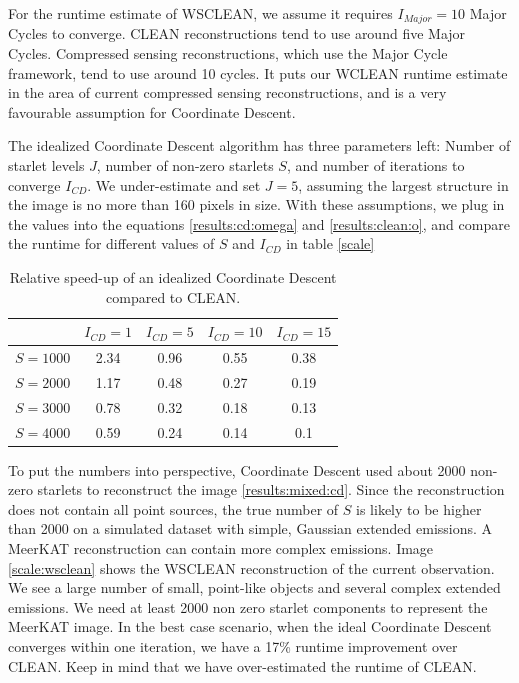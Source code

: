 For the runtime estimate of WSCLEAN, we assume it requires $I_{Major}=10$ Major Cycles to converge. CLEAN reconstructions tend to use around five Major Cycles. Compressed sensing reconstructions, which use the Major Cycle framework, tend to use around 10 cycles. It puts our WCLEAN runtime estimate in the area of current compressed sensing reconstructions, and is a very favourable assumption for Coordinate Descent.

The idealized Coordinate Descent algorithm has three parameters left: Number of starlet levels $J$, number of non-zero starlets $S$, and number of iterations to converge $I_{CD}$. We under-estimate and set $J=5$, assuming the largest structure in the image is no more than 160 pixels in size. With these assumptions, we plug in the values into the equations \eqref{results:cd:omega} and \eqref{results:clean:o}, and compare the runtime for different values of $S$ and $I_{CD}$ in table \ref{scale}

\begin{table}[h!]
	\begin{center}
		\begin{tabular}{l|c|c|c|c} %
			 & $I_{CD} = 1$ & $I_{CD} = 5$ &  $I_{CD} = 10$ &  $I_{CD} = 15$\\
			\hline
			$S=1000$ & 2.34 & 0.96 & 0.55 & 0.38 \\
			$S=2000$ & 1.17 & 0.48 & 0.27 & 0.19\\
			$S=3000$ & 0.78 & 0.32 & 0.18 & 0.13\\
			$S=4000$ & 0.59 & 0.24 & 0.14 & 0.1\\
		\end{tabular}
		\caption{Relative speed-up of an idealized Coordinate Descent compared to CLEAN.}
		\label{scale:cd:table}
	\end{center}
\end{table}

To put the numbers into perspective, Coordinate Descent used about 2000 non-zero starlets to reconstruct the image \ref{results:mixed:cd}. Since the reconstruction does not contain all point sources, the true number of $S$ is likely to be higher than 2000 on a simulated dataset with simple, Gaussian extended emissions. A MeerKAT reconstruction can contain more complex emissions. Image \ref{scale:wsclean} shows the WSCLEAN reconstruction of the current observation. We see a large number of small, point-like objects and several complex extended emissions. We need at least 2000 non zero starlet components to represent the MeerKAT image. In the best case scenario, when the ideal Coordinate Descent converges within one iteration, we have a 17\% runtime improvement over CLEAN. Keep in mind that we have over-estimated the runtime of CLEAN.

